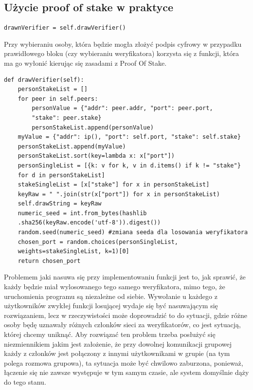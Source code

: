 \subsection{Użycie proof of stake w praktyce}
\label{sec:POSUzycie}
\begin{lstlisting}
drawnVerifier = self.drawVerifier()
\end{lstlisting}
Przy wybieraniu osoby, która będzie mogła złożyć podpis cyfrowy w przypadku prawidłowego bloku (czy wybieraniu weryfikatora) korzysta się z funkcji, która ma go wyłonić kierując się zasadami z Proof Of Stake.
\begin{lstlisting}
def drawVerifier(self):
    personStakeList = []
    for peer in self.peers:
        personValue = {"addr": peer.addr, "port": peer.port,
        "stake": peer.stake}
        personStakeList.append(personValue)
    myValue = {"addr": ip(), "port": self.port, "stake": self.stake}
    personStakeList.append(myValue)
    personStakeList.sort(key=lambda x: x["port"])
    personSingleList = [{k: v for k, v in d.items() if k != "stake"} 
    for d in personStakeList]
    stakeSingleList = [x["stake"] for x in personStakeList]
    keyRaw = " ".join(str(x["port"]) for x in personStakeList)
    self.drawString = keyRaw
    numeric_seed = int.from_bytes(hashlib
    .sha256(keyRaw.encode('utf-8')).digest())
    random.seed(numeric_seed) #zmiana seeda dla losowania weryfikatora
    chosen_port = random.choices(personSingleList, 
    weights=stakeSingleList, k=1)[0]
    return chosen_port
\end{lstlisting}
Problemem jaki nasuwa się przy implementowaniu funkcji jest to, jak sprawić, że każdy będzie miał wylosowanego tego samego weryfikatora, mimo tego, że uruchomienia programu są niezależne od siebie. Wywołanie u każdego z użytkowników zwykłej funkcji losującej wydaje się być nasuwającym się rozwiązaniem, lecz w rzeczywistości może doprowadzić to do sytuacji, gdzie różne osoby będę uznawały różnych członków sieci za weryfikatorów, co jest sytuacją, której chcemy uniknąć. Aby rozwiązać ten problem trzeba posłużyć się niezmiennikiem jakim jest założenie, że przy dowolnej komunikacji grupowej każdy z członków jest połączony z innymi użytkownikami w grupie (na tym polega rozmowa grupowa), ta sytuacja może być chwilowo zaburzona, ponieważ, łączenie się nie zawsze występuje w tym samym czasie, ale system domyślnie dąży do tego stanu.

\vspace{1em}

